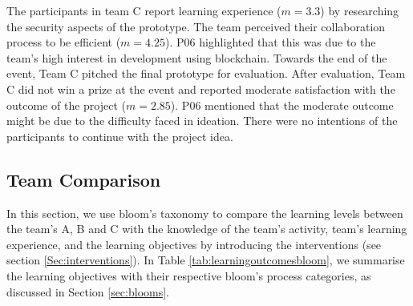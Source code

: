 \documentclass[runningheads]{llncs}
\begin{document}
The participants in team C report learning experience ($m = 3.3$) by researching the security aspects of the prototype. The team perceived their collaboration process to be efficient ($m = 4.25$). P06 highlighted that this was due to the team's high interest in development using blockchain. Towards the end of the event, Team C pitched the final prototype for evaluation. After evaluation, Team C did not win a prize at the event and reported moderate satisfaction with the outcome of the project ($m = 2.85$). P06 mentioned that the moderate outcome might be due to the difficulty faced in ideation. There were no intentions of the participants to continue with the project idea.


\subsection{Team Comparison} \label{teamcomparison}
In this section, we use bloom's taxonomy to compare the learning levels between the team's A, B and C with the knowledge of the team's activity, team's learning experience, and the learning objectives by introducing the interventions (see section \ref{Sec:interventions}). In Table \ref{tab:learningoutcomesbloom}, we summarise the learning objectives with their respective bloom's process categories, as discussed in Section \ref{sec:blooms}.
\end{document}
